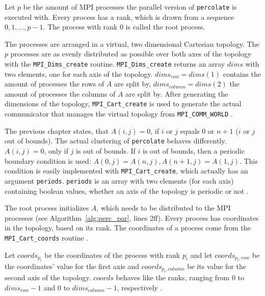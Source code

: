 \documentclass[twoside,11pt]{article}
\def\perc{\texttt{perco\-late}}
\begin{document}
Let $p$ be the amount of MPI processes the parallel version
of \perc{} is executed with.
Every process has a rank, which is drawn from a sequence
$0,1,\dots,p-1$.
The process with rank 0 is called the root process.

The processes are arranged in a virtual, two dimensional
Cartesian topology.
The $p$ processes are as evenly distributed as possible
over both axes of the topology with the
\texttt{MPI\_Dims\_create} routine.
\texttt{MPI\_Dims\_create} returns an array $dims$ with two
elements, one for each axis of the topology.
$dims_{row} = dims(1)$ contains the amount of processes the
rows of $A$ are split by, $dims_{column} = dims(2)$ the
amount of processes the columns of $A$ are split by.
After generating the dimensions of the topology,
\texttt{MPI\_Cart\_create} is used to generate the actual
communicator that manages the virtual topology from
\texttt{MPI\_COMM\_WORLD} \citep[see][Chapter 7]{mpi}.

The previous chapter states, that $A(i, j) = 0$, if $i$ or
$j$ equals $0$ or $n + 1$ ($i$ or $j$ out of bounds).
The actual clustering of \perc{} behaves differently.
$A(i, j) = 0$, only if $j$ is out of bounds.
If $i$ is out of bounds, then a periodic boundary condition
is used: $A(0, j) = A(n, j), A(n + 1, j) = A(1, j)$.
This condition is easily implemented with
\texttt{MPI\_Cart\_create}, which actually has an argument
\texttt{periods}. \texttt{periods} is an array with two
elements (for each axis) containing boolean values, whether
an axis of the topology is periodic or not
\citep[see][Chapter 7]{mpi}.

The root process initializes $A$, which needs to be
distributed to the MPI processes (see
Algorithm~\ref{alg:perc_par}, lines 2ff).
Every process has coordinates in the topology, based on
its rank.
The coordinates of a process come from the
\texttt{MPI\_Cart\_coords} routine
\citep[see][Chapter 7]{mpi}.

Let $coords_{p_i}$ be the coordinates of the process with
rank $p_i$ and let $coords_{p_i, row}$ be the coordinates'
value for the first axis and $coords_{p_i, column}$ be its
value for the second axis of the topology.
$coords$ behaves like the ranks, ranging from $0$ to
$dims_{row} - 1$ and $0$ to $dims_{column} - 1$,
respectively \citep[see][Chapter 7]{mpi}.
\end{document}
